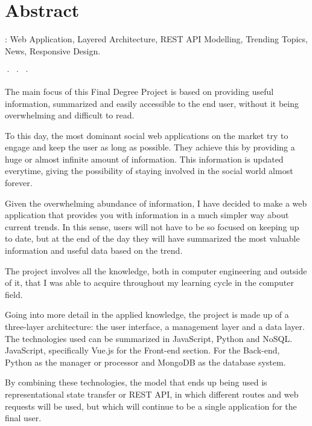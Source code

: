 \begingroup

\chapter*{Abstract}

\noindent{}: Web Application, Layered Architecture, REST API Modelling, Trending Topics, News, Responsive Design.
\begin{center}
· · ·
\end{center}

The main focus of this Final Degree Project is based on providing useful information, summarized and easily accessible to the end user, without it being overwhelming and difficult to read.

\vspace{0.3cm}

To this day, the most dominant social web applications on the market try to engage and keep the user as long as possible. They achieve this by providing a huge or almost infinite amount of information. This information is updated everytime, giving the possibility of staying involved in the social world almost forever.

\vspace{0.3cm}

Given the overwhelming abundance of information, I have decided to make a web application that provides you with information in a much simpler way about current trends. In this sense, users will not have to be so focused on keeping up to date, but at the end of the day they will have summarized the most valuable information and useful data based on the trend.

\vspace{0.3cm}

The project involves all the knowledge, both in computer engineering and outside of it, that I was able to acquire throughout my learning cycle in the computer field.

\vspace{0.3cm}

Going into more detail in the applied knowledge, the project is made up of a three-layer architecture: the user interface, a management layer and a data layer. The technologies used can be summarized in JavaScript, Python and NoSQL. JavaScript, specifically Vue.js for the Front-end section. For the Back-end, Python as the manager or processor and MongoDB as the database system.

\vspace{0.3cm}

By combining these technologies, the model that ends up being used is representational state transfer or REST API, in which different routes and web requests will be used, but which will continue to be a single application for the final user.

\vfill
